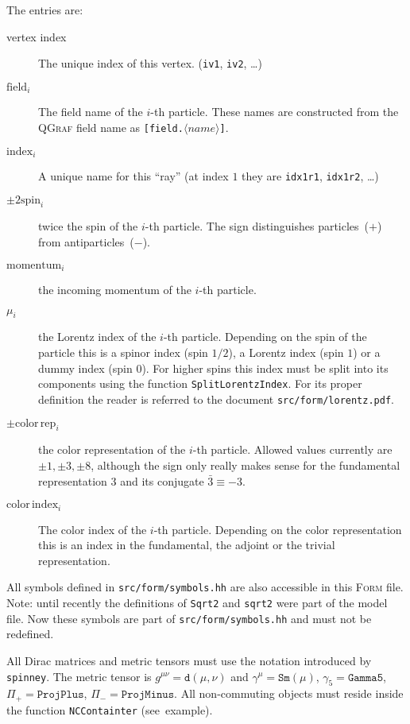 \documentclass[11pt,a4paper]{refrep}
\newcommand{\qgraf}{\textsc{QGraf}\xspace}
\newcommand{\form}{\textsc{Form}\xspace}
\begin{document}
The entries are:
\begin{description}
\item[vertex index] The unique index of this vertex. (\texttt{iv1}, \texttt{iv2}, \dots)
\item[$\mathrm{field}_i$] The field name of the $i$-th particle. These names are constructed
from the \qgraf{} field name as \texttt{[field.$\langle name\rangle$]}.
\item[$\mathrm{index}_i$] A unique name for this ``ray'' (at index $1$ they are \texttt{idx1r1},
   \texttt{idx1r2}, \ldots)
\item[$\pm2\mathrm{spin}_i$] twice the spin of the $i$-th particle.
   The sign distinguishes particles~($+$) from antiparticles~($-$).
\item[$\mathrm{momentum}_i$] the incoming momentum of the $i$-th particle.
\item[$\mu_i$] the Lorentz index of the $i$-th particle. Depending on the spin of the particle
   this is a spinor index (spin $1/2$), a Lorentz index (spin $1$) or a dummy index (spin $0$).
   For higher spins this index must be split into its components using the function
   \texttt{SplitLorentzIndex}. For its proper definition the reader is referred to
   the document \texttt{src/form/lorentz.pdf}.
\item[$\pm\mathrm{color\,rep}_i$] the color representation of the $i$-th particle. Allowed
   values currently are $\pm1,\pm3,\pm8$, although the sign only really makes sense for the
   fundamental representation $3$ and its conjugate $\bar{3}\equiv-3$.
\item[$\mathrm{color\,index}_i$] The color index of the $i$-th particle. Depending on the color
   representation this is an index in the fundamental, the adjoint or the trivial representation.
\end{description}

All symbols defined in \texttt{src/form/symbols.hh} are also accessible in this \form{} file.
\attention Note: until recently the definitions of \texttt{Sqrt2} and \texttt{sqrt2} were part
of the model file. Now these symbols are part of \texttt{src/form/symbols.hh} and must not be
redefined.

\attention All Dirac matrices and metric tensors must use the notation introduced by \texttt{spinney}.
The metric tensor is $g^{\mu\nu}=\mathtt{d}(\mu, \nu)$ and $\gamma^\mu=\mathtt{Sm}(\mu)$,
$\gamma_5=\mathtt{Gamma5}$, $\Pi_+=\mathtt{ProjPlus}$, $\Pi_-=\mathtt{ProjMinus}$. All non-commuting
objects must reside inside the function \texttt{NCContainter} (see~example).
\end{document}
